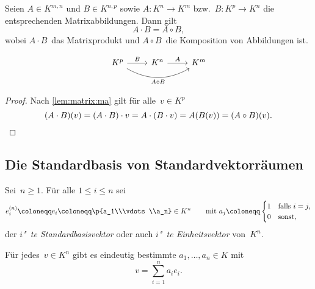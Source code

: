 \documentclass[a4paper]{article}
\begin{document}
\begin{theorem}
    Seien $A \in K^{m,n}$ und $B \in K^{n,p}$ sowie $A\colon K^n \to K^m$ bzw.\ $B\colon K^p \to K^n$ die entsprechenden Matrixabbildungen. Dann gilt
    \begin{equation*}
        A\cdot B = A\circ B,
    \end{equation*}
    wobei $A\cdot B$~das Matrixprodukt und $A\circ B$~die Komposition von Abbildungen ist.
\end{theorem}

\begin{equation*}
    \begin{tikzcd}
        K^p \ar[rr, bend right, "A\circ B"'] \ar[r, "B"] & K^n \ar[r, "A"] & K^m
    \end{tikzcd}
\end{equation*}

\begin{proof}
    Nach \cref{lem:matrix:ma} gilt für alle~$v \in K^p$
    \begin{equation*}
        (A\cdot B)(v) = (A\cdot B)\cdot v = A\cdot(B\cdot v) = A(B(v)) = (A\circ B)(v). \qedhere
    \end{equation*}
\end{proof}

\subsection{Die Standardbasis von Standardvektorräumen}

\begin{definition}[Standardbasisvektor]
    Sei~$n \geq 1$. Für alle $1 \leq i \leq n$ sei
    \begin{equation*}
        e^{(n)}_i \coloneqq e_i \coloneqq \p{a_1\\\vdots\\a_n} \in K^n \qquad\text{mit } a_j \coloneqq \begin{cases}
            1 & \text{falls } i = j, \\
            0 & \text{sonst},
        \end{cases}
    \end{equation*}
    der \emph{$i$"~te Standardbasisvektor} oder auch \emph{$i$"~te Einheitsvektor} von~$K^n$.
\end{definition}

\begin{lemma}
    Für jedes~$v \in K^n$ gibt es eindeutig bestimmte $a_1,\dots,a_n \in K$ mit
    \begin{equation*}
        v = \sum_{i=1}^n a_ie_i.
    \end{equation*}
\end{lemma}
\end{document}
